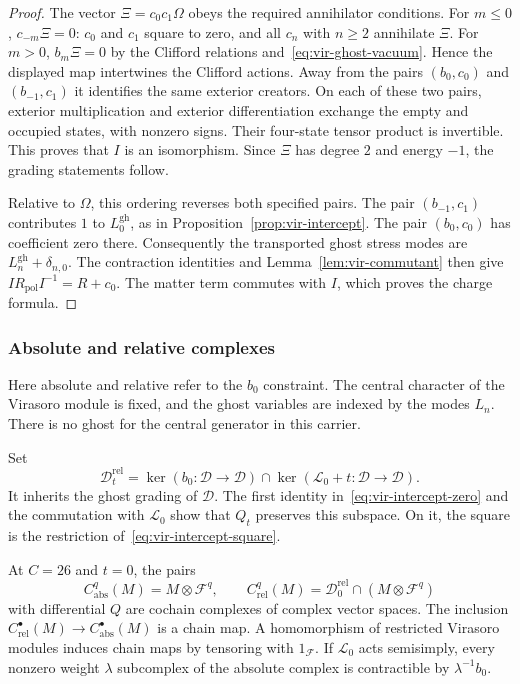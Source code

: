 \begin{proof}
The vector $\Xi=c_0c_1\Omega$ obeys the required annihilator conditions.
For $m\leq0$, $c_{-m}\Xi=0$: $c_0$ and $c_1$ square to zero, and all $c_n$ with $n\geq2$ annihilate $\Xi$.
For $m>0$, $b_m\Xi=0$ by the Clifford relations and~\eqref{eq:vir-ghost-vacuum}.
Hence the displayed map intertwines the Clifford actions.
Away from the pairs $(b_0,c_0)$ and $(b_{-1},c_1)$ it identifies the same exterior creators.
On each of these two pairs, exterior multiplication and exterior differentiation exchange the empty and occupied states, with nonzero signs.
Their four-state tensor product is invertible.
This proves that $I$ is an isomorphism.
Since $\Xi$ has degree $2$ and energy $-1$, the grading statements follow.

Relative to $\Omega$, this ordering reverses both specified pairs.
The pair $(b_{-1},c_1)$ contributes $1$ to $L_0^{\mathrm{gh}}$, as in Proposition~\ref{prop:vir-intercept}.
The pair $(b_0,c_0)$ has coefficient zero there.
Consequently the transported ghost stress modes are $L_n^{\mathrm{gh}}+\delta_{n,0}$.
The contraction identities and Lemma~\ref{lem:vir-commutant} then give
$I R_{\mathrm{pol}}I^{-1}=R+c_0$.
The matter term commutes with $I$, which proves the charge formula.
\end{proof}

\subsubsection{Absolute and relative complexes}

Here absolute and relative refer to the $b_0$ constraint.
The central character of the Virasoro module is fixed, and the ghost variables are indexed by the modes $L_n$.
There is no ghost for the central generator in this carrier.

Set
\[
 \mathcal D_t^{\mathrm{rel}}=
 \ker(b_0:\mathcal D\to\mathcal D)
 \cap\ker(\mathcal L_0+t:\mathcal D\to\mathcal D).
\]
It inherits the ghost grading of $\mathcal D$.
The first identity in~\eqref{eq:vir-intercept-zero} and the commutation with $\mathcal L_0$ show that $Q_t$ preserves this subspace.
On it, the square is the restriction of~\eqref{eq:vir-intercept-square}.

\begin{corollary}\label{cor:vir-complexes}
At $C=26$ and $t=0$, the pairs
\[
 C_{\mathrm{abs}}^q(M)=M\otimes\mathcal F^q,
 \qquad
 C_{\mathrm{rel}}^q(M)=\mathcal D_0^{\mathrm{rel}}\cap(M\otimes\mathcal F^q)
\]
with differential $Q$ are cochain complexes of complex vector spaces.
The inclusion $C_{\mathrm{rel}}^\bullet(M)\to C_{\mathrm{abs}}^\bullet(M)$ is a chain map.
A homomorphism of restricted Virasoro modules induces chain maps by tensoring with $1_{\mathcal F}$.
If $\mathcal L_0$ acts semisimply, every nonzero weight $\lambda$ subcomplex of the absolute complex is contractible by $\lambda^{-1}b_0$.
\end{corollary}

